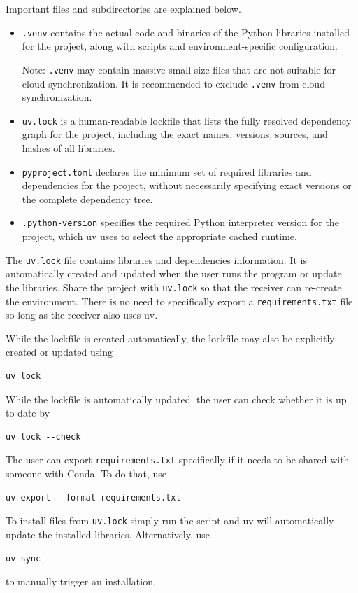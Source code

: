 Important files and subdirectories are explained below.
\begin{itemize}
	\item \verb|.venv| contains the actual code and binaries of the Python libraries installed for the project, along with scripts and environment-specific configuration. 
	
	Note: \verb|.venv| may contain massive small-size files that are not suitable for cloud synchronization. It is recommended to exclude \verb|.venv| from cloud synchronization.
	
	\item \verb|uv.lock| is a human-readable lockfile that lists the fully resolved dependency graph for the project, including the exact names, versions, sources, and hashes of all libraries.
	\item \verb|pyproject.toml| declares the minimum set of required libraries and dependencies for the project, without necessarily specifying exact versions or the complete dependency tree.
	\item \verb|.python-version| specifies the required Python interpreter version for the project, which uv uses to select the appropriate cached runtime.
\end{itemize}

The \verb|uv.lock| file contains libraries and dependencies information. It is automatically created and updated when the user runs the program or update the libraries. Share the project with \verb|uv.lock| so that the receiver can re-create the environment. There is no need to specifically export a \verb|requirements.txt| file so long as the receiver also uses uv.

While the lockfile is created automatically, the lockfile may also be explicitly created or updated using
\begin{lstlisting}
uv lock
\end{lstlisting}
While the lockfile is automatically updated. the user can check whether it is up to date by
\begin{lstlisting}
uv lock --check
\end{lstlisting}
The user can export \verb|requirements.txt| specifically if it needs to be shared with someone with Conda. To do that, use
\begin{lstlisting}
uv export --format requirements.txt
\end{lstlisting}

To install files from \verb|uv.lock| simply run the script and uv will automatically update the installed libraries. Alternatively, use
\begin{lstlisting}
uv sync
\end{lstlisting}
to manually trigger an installation.

